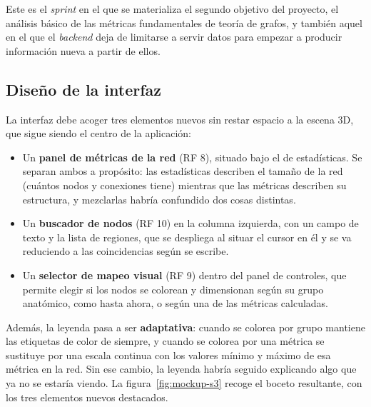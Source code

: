 Este es el \textit{sprint} en el que se materializa el segundo objetivo del proyecto, el análisis
básico de las métricas fundamentales de teoría de grafos, y también aquel en el que el
\textit{backend} deja de limitarse a servir datos para empezar a producir información nueva a partir
de ellos.

\subsection{Diseño de la interfaz}

La interfaz debe acoger tres elementos nuevos sin restar espacio a la escena 3D, que sigue siendo el
centro de la aplicación:

\begin{itemize}
	\item Un \textbf{panel de métricas de la red} (RF 8), situado bajo el de estadísticas. Se
		separan ambos a propósito: las estadísticas describen el tamaño de la red (cuántos
		nodos y conexiones tiene) mientras que las métricas describen su estructura, y mezclarlas
		habría confundido dos cosas distintas.
	\item Un \textbf{buscador de nodos} (RF 10) en la columna izquierda, con un campo de texto y la
		lista de regiones, que se despliega al situar el cursor en él y se va reduciendo a las
		coincidencias según se escribe.
	\item Un \textbf{selector de mapeo visual} (RF 9) dentro del panel de controles, que permite
		elegir si los nodos se colorean y dimensionan según su grupo anatómico, como hasta ahora, o
		según una de las métricas calculadas.
\end{itemize}

Además, la leyenda pasa a ser \textbf{adaptativa}: cuando se colorea por grupo mantiene las etiquetas
de color de siempre, y cuando se colorea por una métrica se sustituye por una escala continua con los
valores mínimo y máximo de esa métrica en la red. Sin ese cambio, la leyenda habría seguido
explicando algo que ya no se estaría viendo. La figura~\ref{fig:mockup-s3} recoge el boceto
resultante, con los tres elementos nuevos destacados.

